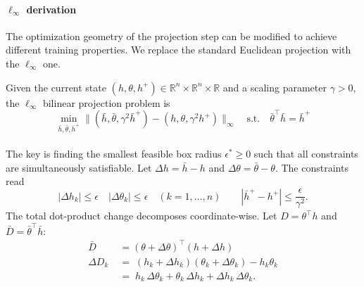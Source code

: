\documentclass{article}
\begin{document}
\paragraph{$\ell_\infty$ derivation}
\label{sec:bilinear-inf}
\label{sec:linf}
The optimization geometry of the projection step can be modified to achieve
different training properties. We replace the standard Euclidean projection with
the $\ell_\infty$ one.

Given the current state $(h, \theta, h^{+}) \in \mathbb{R}^n \times \mathbb{R}^n \times
\mathbb{R}$ and a scaling parameter $\gamma > 0$, the $\ell_\infty$ bilinear
projection problem is
\begin{equation}
\min_{\bar{h}, \bar{\theta}, \bar{h}^+} \| (\bar{h}, \bar{\theta}, \gamma^2 \bar{h}^+) - (h, \theta, \gamma^2 h^+) \|_\infty \quad \text{s.t.} \quad \bar{\theta}^\top \bar{h} = \bar{h}^+
\end{equation}
\\
The key is finding the smallest feasible box radius $\epsilon^* \geq 0$ such
that all constraints are simultaneously satisfiable. Let $\Delta h = \bar h - h$ and $\Delta \theta = \bar \theta - \theta$. The
constraints read
\[
  |\Delta h_k| \leq \epsilon \quad |\Delta \theta_{k}| \leq \epsilon
  \quad (k=1,\dots,n) 
  \qquad |\bar h^{+} - h^{+}| \leq \frac{\epsilon}{\gamma^2}.
\]
The total dot-product change decomposes coordinate-wise. Let $D = \theta^\top h$ and $\bar{D} = \bar{\theta}^\top \bar{h}$:
\begin{equation}
\label{eq:bilinf-DeltaP}
\begin{aligned}
 \bar{D} &= (\theta + \Delta \theta)^\top (h + \Delta h) \\
  \Delta D_k 
    \;&=\; (h_k+\Delta h_k)(\theta_{k}+\Delta \theta_{k}) - h_k \theta_{k} \\
    \;&=\; h_k\,\Delta \theta_{k} + \theta_{k}\,\Delta h_k + \Delta h_k\,\Delta \theta_{k}.
\end{aligned}
\end{equation}
\end{document}
